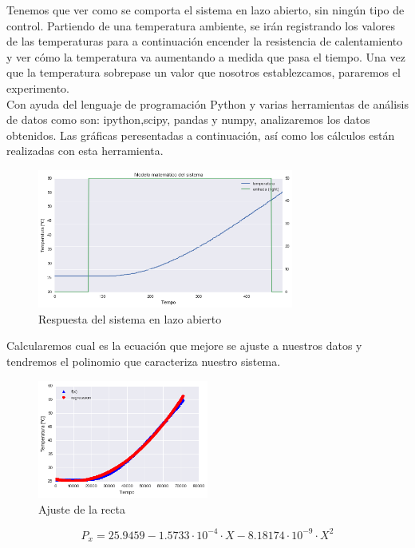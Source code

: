 Tenemos que ver como se comporta el sistema en lazo abierto, sin ningún tipo de control. Partiendo de una temperatura ambiente, se irán registrando los valores de las temperaturas para a continuación encender la resistencia de calentamiento y ver cómo la temperatura va aumentando a medida que pasa el tiempo. Una vez que la temperatura sobrepase un valor que nosotros establezcamos, pararemos el experimento.\\

Con ayuda del lenguaje de programación Python y varias herramientas de análisis de datos como son: ipython,scipy, pandas y numpy, analizaremos los datos obtenidos. Las gráficas peresentadas a continuación, así como los cálculos están realizadas con esta herramienta.

    \begin{figure}[H]
            \centering
            \includegraphics[width=0.75\textwidth]{images/PLC/modelado/modelado_9_1.png}
            \caption{Respuesta del sistema en lazo abierto}
            \label{fig:plc_lazo_abierto}
    \end{figure}

Calcularemos cual es la ecuación que mejore se ajuste a nuestros datos y tendremos el polinomio que caracteriza nuestro sistema.
    \begin{figure}[H]
            \centering
            \includegraphics[width=0.5\textwidth]{images/PLC/modelado/modelado_13_1.png}
            \caption{Ajuste de la recta}
            \label{fig:plc_lazo_abierto2}
    \end{figure}
$$P_x=  25.9459 -1.5733 \cdot 10^{-4} \cdot X - 8.18174 \cdot 10^{-9} \cdot X^2$$

